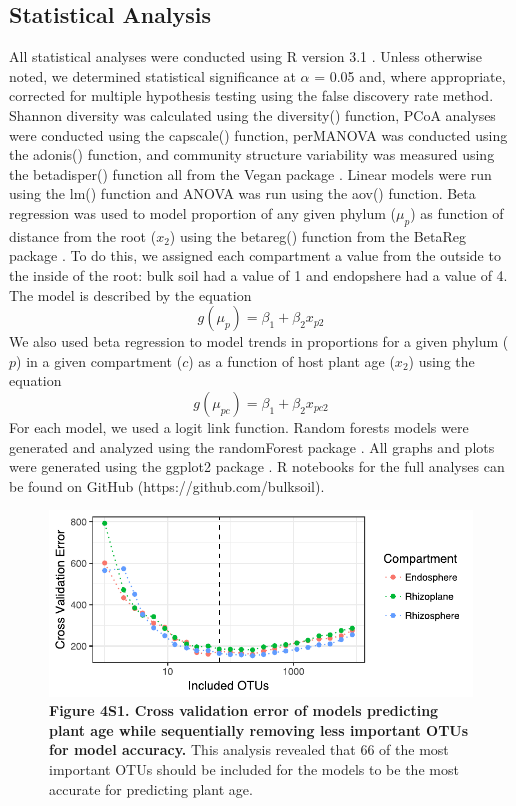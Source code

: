 \subsection{Statistical Analysis}
%
All statistical analyses were conducted using R version 3.1 \cite{RCoreTeam2016}. Unless otherwise noted, we determined statistical significance at $\alpha$ = 0.05 and, where appropriate, corrected for multiple hypothesis testing using the false discovery rate method. Shannon diversity was calculated using the diversity() function, PCoA analyses were conducted using the capscale() function, perMANOVA was conducted using the adonis() function, and community structure variability was measured using the betadisper() function all from the Vegan package \cite{Oksanen2013}. Linear models were run using the lm() function and ANOVA was run using the aov() function. Beta regression was used to model proportion of any given phylum ($\mu_p$) as function of distance from the root ($x_2$) using the betareg() function from the BetaReg package \cite{Cribari-Neto}. To do this, we assigned each compartment a value from the outside to the inside of the root: bulk soil had a value of 1 and endopshere had a value of 4. The model is described by the equation
\begin{equation}
    g(\mu_p) = \beta_1 + \beta_2 x_{p2}
 \end{equation}
 We also used beta regression to model trends in proportions for a given phylum ($p$) in a given compartment ($c$) as a function of host plant age ($x_2$) using the equation
 \begin{equation}
 	g(\mu_{pc}) = \beta_1 + \beta_2 x_{pc2}
 \end{equation}
 For each model, we used a logit link function. Random forests models were generated and analyzed using the randomForest package \cite{Liaw2015}. All graphs and plots were generated using the ggplot2 package \cite{Wickham2009}. R notebooks for the full analyses can be found on GitHub (https://github.com/bulksoil).

\newpage

\begin{figure}[h]
\centering
\includegraphics[width=5in]{Figures/figure3_s1}
\captionsetup{labelformat=empty}
\caption[Figure 4S1]{\textbf{Figure 4S1. Cross validation error of models predicting plant age while sequentially removing less important OTUs for model accuracy.} This analysis revealed that 66 of the most important OTUs should be included for the models to be the most accurate for predicting plant age.}
\label{Figure 4S1}
\end{figure}

